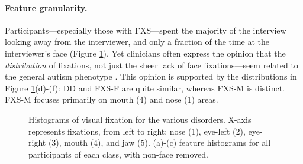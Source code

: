 \documentclass{llncs}
\begin{document}
  \paragraph{Feature granularity.} Participants---especially those with FXS---spent the majority of the interview looking away from the interviewer, and only a fraction of the time at the interviewer's face (Figure \ref{fig:histo}). Yet clinicians often express the opinion that the \emph{distribution} of fixations, not just the sheer lack of face fixations---seem related to the general autism phenotype \cite{klin2002,jones2013}. This opinion is supported by the distributions in Figure \ref{fig:histo}(d)-(f): DD and FXS-F are quite similar, whereas FXS-M is distinct. FXS-M focuses primarily on mouth (4) and nose (1) areas.

  \begin{figure}[t]
    \hfill
    \hfill
    \caption{Histograms of visual fixation for the various disorders. X-axis represents fixations, from left to right: nose (1), eye-left (2), eye-right (3), mouth (4), and jaw (5). (a)-(c) feature histograms for all participants of each class, with non-face removed.}
    \label{fig:histo}
    \vspace{-2ex}
  \end{figure}
\end{document}
